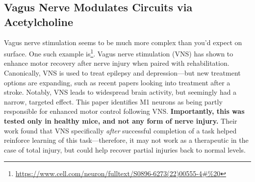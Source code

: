 







\subsection{Vagus Nerve Modulates Circuits via Acetylcholine}

Vagus nerve stimulation seems to be much more complex than you'd expect on surface. One such example is\footnote{\url{https://www.cell.com/neuron/fulltext/S0896-6273(22)00555-4\#\%20}}. Vagus nerve stimulation (VNS) has shown to enhance motor recovery after nerve injury when paired with rehabilitation. Canonically, VNS is used to treat epilepsy and depression---but new treatment options are expanding, such as recent papers looking into treatment after a stroke. Notably, VNS leads to widespread brain activity, but seemingly had a narrow, targeted effect. This paper identifies M1 neurons as being partly responsible for enhanced motor control following VNS. \textbf{Importantly, this was tested only in healthy mice, and not any form of nerve injury.} Their work found that VNS specifically \textit{after} successful completion of a task helped reinforce learning of this task---therefore, it may not work as a therapeutic in the case of total injury, but could help recover partial injuries back to normal levels.\newline

